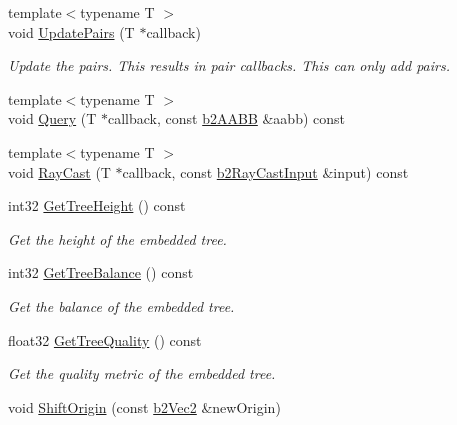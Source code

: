 \begin{DoxyCompactItemize}
{\footnotesize template$<$typename T $>$ }\\void \hyperlink{classb2BroadPhase_a0a1acd693466b997700242ae00784c20}{Update\+Pairs} (T $\ast$callback)
\begin{DoxyCompactList}\small\item\em Update the pairs. This results in pair callbacks. This can only add pairs. \end{DoxyCompactList}\item 
{\footnotesize template$<$typename T $>$ }\\void \hyperlink{classb2BroadPhase_a187586ea98b9d16e5ef6e12fa31f8de2}{Query} (T $\ast$callback, const \hyperlink{structb2AABB}{b2\+A\+A\+BB} \&aabb) const
\item 
{\footnotesize template$<$typename T $>$ }\\void \hyperlink{classb2BroadPhase_ae65392ea91c7d0839ed5312f78b2837a}{Ray\+Cast} (T $\ast$callback, const \hyperlink{structb2RayCastInput}{b2\+Ray\+Cast\+Input} \&input) const
\item 
\mbox{\label{classb2BroadPhase_a868f95225d62c3ea79d231ed305253ea}} 
int32 \hyperlink{classb2BroadPhase_a868f95225d62c3ea79d231ed305253ea}{Get\+Tree\+Height} () const
\begin{DoxyCompactList}\small\item\em Get the height of the embedded tree. \end{DoxyCompactList}\item 
\mbox{\label{classb2BroadPhase_a29612faf9f0191827440178629d5e887}} 
int32 \hyperlink{classb2BroadPhase_a29612faf9f0191827440178629d5e887}{Get\+Tree\+Balance} () const
\begin{DoxyCompactList}\small\item\em Get the balance of the embedded tree. \end{DoxyCompactList}\item 
\mbox{\label{classb2BroadPhase_a4e7d2f5d16ac100b18511e6a42e758bf}} 
float32 \hyperlink{classb2BroadPhase_a4e7d2f5d16ac100b18511e6a42e758bf}{Get\+Tree\+Quality} () const
\begin{DoxyCompactList}\small\item\em Get the quality metric of the embedded tree. \end{DoxyCompactList}\item 
void \hyperlink{classb2BroadPhase_a410e6115e3d1b4fca61cfbf397767772}{Shift\+Origin} (const \hyperlink{structb2Vec2}{b2\+Vec2} \&new\+Origin)
\end{DoxyCompactItemize}
